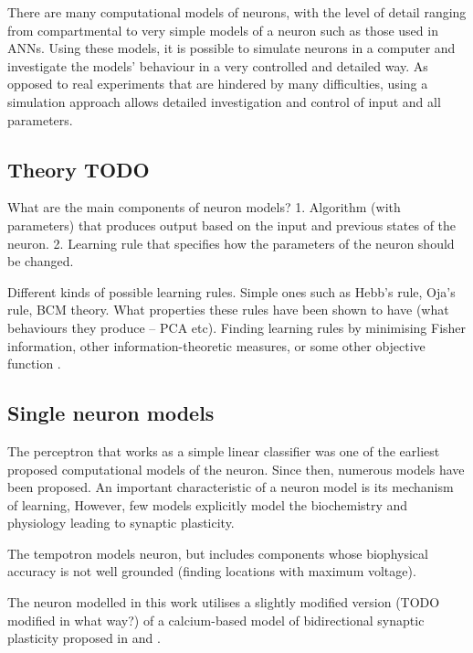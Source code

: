 \documentclass[a4paper,12pt]{report}
\theoremstyle{definition}
\begin{document}
There are many computational models of neurons, with the level of detail ranging from compartmental to very simple models of a neuron such as those used in ANNs. Using these models, it is possible to simulate neurons in a computer and investigate the models' behaviour in a very controlled and detailed way. As opposed to real experiments that are hindered by many difficulties, using a simulation approach allows detailed investigation and control of input and all parameters.

\subsection{Theory TODO}
What are the main components of neuron models? 1. Algorithm (with parameters) that produces output based on the input and previous states of the neuron. 2. Learning rule that specifies how the parameters of the neuron should be changed.

Different kinds of possible learning rules. Simple ones such as Hebb's rule, Oja's rule, BCM theory. What properties these rules have been shown to have (what behaviours they produce -- PCA etc). Finding learning rules by minimising Fisher information, other information-theoretic measures, or some other objective function \cite{echeveste2014generating}.


\subsection{Single neuron models}


The perceptron \cite{rosenblatt1958perceptron} that works as a simple linear classifier was one of the earliest proposed computational models of the neuron. Since then, numerous models have been proposed. An important characteristic of a neuron model is its mechanism of learning, However, few models explicitly model the biochemistry and physiology leading to synaptic plasticity.

The tempotron \cite{gutig2006tempotron} models neuron, but includes components whose biophysical accuracy is not well grounded (finding locations with maximum voltage).

The neuron modelled in this work utilises a slightly modified version (TODO modified in what way?) of a calcium-based model of bidirectional synaptic plasticity proposed in \cite{shouval2002unified} and \cite{yeung2004synaptic}.
\end{document}
